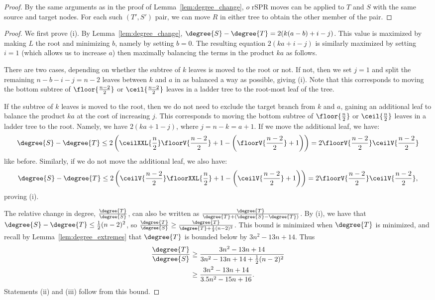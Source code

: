 \documentclass[11pt,onecolumn,conference]{IEEEtran}
\begin{document}
\pairedneighbors*
\begin{proof}
By the same arguments as in the proof of Lemma~\ref{lem:degree_change}, $o$ rSPR moves can be applied to $T$ and $S$ with the same source and target nodes.
For each such $(T',S')$ pair, we can move $R$ in either tree to obtain the other member of the pair.
\end{proof}

\degreemaxdeltaadjacent
\begin{proof}
	We first prove (i).
	By Lemma~\ref{lem:degree_change}, $\degree{S} - \degree{T} = 2(k(a-b) + i - j)$.
	This value is maximized by making $L$ the root and minimizing $b$, namely by setting $b=0$.
	The resulting equation $2(ka + i - j)$ is similarly maximized by setting $i=1$ (which allows us to increase $a$) then maximally balancing the terms in the product $ka$ as follows.

	There are two cases, depending on whether the subtree of $k$ leaves is moved to the root or not.
    If not, then we set $j=1$ and split the remaining $n-b-i-j = n-2$ leaves between $k$ and $a$ in as balanced a way as possible, giving (i).
	Note that this corresponds to moving the bottom subtree of $\floor{\frac{n-2}{2}}$ or $\ceil{\frac{n-2}{2}}$ leaves in a ladder tree to the root-most leaf of the tree.

	If the subtree of $k$ leaves is moved to the root, then we do not need to exclude the target branch from $k$ and $a$, gaining an additional leaf to balance the product $ka$ at the cost of increasing $j$.
	This corresponds to moving the bottom subtree of $\floor{\frac{n}{2}}$ or $\ceil{\frac{n}{2}}$ leaves in a ladder tree to the root.
	Namely, we have $2(ka + 1 - j)$, where $j = n - k = a + 1$.
	If we move the additional leaf, we have:
$$\degree{S} - \degree{T} \le 2\left(\ceilXXL{\frac{n}{2}}\floorV{\frac{n-2}{2}}  + 1 - \left(\floorV{\frac{n-2}{2}} + 1\right)\right) = 2\floorV{\frac{n-2}{2}}\ceilV{\frac{n-2}{2}}$$
like before.
Similarly, if we do not move the additional leaf, we also have:
$$\degree{S} - \degree{T} \le 2 \left(\ceilV{\frac{n-2}{2}}\floorXXL{\frac{n}{2}} +1 -  \left(\ceilV{\frac{n-2}{2}} + 1\right)\right) = 2\floorV{\frac{n-2}{2}}\ceilV{\frac{n-2}{2}},$$
proving (i).

The relative change in degree, $\frac{\degree{T}}{\degree{S}}$, can also be written as $\frac{\degree{T}}{\degree{T} + (\degree{S} - \degree{T})}$.
By (i), we have that $\degree{S} - \degree{T} \le \frac{1}{2} (n-2)^2$,
so $\frac{\degree{T}}{\degree{S}} \ge \frac{\degree{T}}{\degree{T} + \frac{1}{2} (n-2)^2} $.
This bound is minimized when $\degree{T}$ is minimized, and recall by Lemma~\ref{lem:degree_extremes} that $\degree{T}$ is bounded below by $3n^2 - 13n + 14$.
	Thus
	\begin{align*}
		\frac{\degree{T}}{\degree{S}} &\ge \frac{3n^2 - 13n + 14}{3n^2 - 13n + 14 + \frac{1}{2}(n-2)^2} \\
		&\ge \frac{3n^2 - 13n + 14}{3.5n^2 - 15n + 16}.
	\end{align*}
	Statements (ii) and (iii) follow from this bound.

\end{proof}
\end{document}
